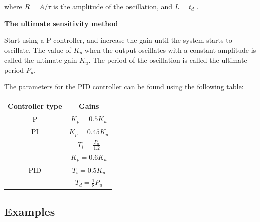 where $R=A/\tau$ is the amplitude of the oscillation, and $L = t_d$ .

\textbf{The ultimate sensitivity method}

Start using a P-controller, and increase the gain until the system starts to oscillate.
The value of $K_p$ when the output oscillates with a constant amplitude is called the ultimate gain $K_u$.
The period of the oscillation is called the ultimate period $P_u$.

The parameters for the PID controller can be found using the following table:
\begin{table}[h]
	\centering
	\begin{tabular}{|c|c|}
		\hline
		\cellcolor[HTML]{C0C0C0} \textbf{Controller type} & \cellcolor[HTML]{C0C0C0}\textbf{Gains} \\ \hline
		P                                                 & $K_p=0.5K_u$                           \\ \hline
		PI                                                & $K_p=0.45K_u$                          \\
		                                                  & $T_i=\frac{P_u}{1.2}$                  \\ \hline
		                                                  & $K_p=0.6K_u$                           \\
		PID                                               & $T_i=0.5K_u$                           \\
		                                                  & $T_d=\frac{1}{8}P_u$                   \\ \hline
	\end{tabular}
\end{table}


\subsection{Examples}

